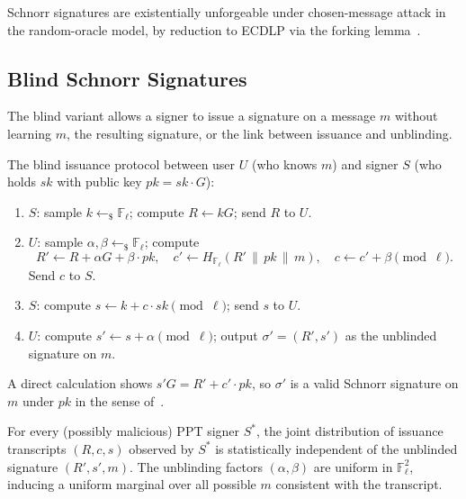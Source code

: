\begin{theorem}
\label{thm:schnorr-euf}
Schnorr signatures are existentially unforgeable under chosen-message attack in the random-oracle model, by reduction to ECDLP via the forking lemma~\cite{pointcheval-stern1996}.
\end{theorem}

\subsection{Blind Schnorr Signatures}
\label{sec:blind-schnorr}

The blind variant allows a signer to issue a signature on a message $m$ without learning $m$, the resulting signature, or the link between issuance and unblinding.

\begin{construction}
\label{con:blind-schnorr}
The blind issuance protocol between user $U$ (who knows $m$) and signer $S$ (who holds $sk$ with public key $pk = sk \cdot G$):
\begin{enumerate}[leftmargin=2em,itemsep=0.2em]
  \item $S$: sample $k \leftarrow_\$ \mathbb{F}_\ell$; compute $R \gets kG$; send $R$ to $U$.
  \item $U$: sample $\alpha, \beta \leftarrow_\$ \mathbb{F}_\ell$; compute
    \[
      R' \gets R + \alpha G + \beta \cdot pk, \quad
      c' \gets H_{\mathbb{F}_\ell}(R' \,\|\, pk \,\|\, m), \quad
      c \gets c' + \beta \pmod{\ell}.
    \]
    Send $c$ to $S$.
  \item $S$: compute $s \gets k + c \cdot sk \pmod{\ell}$; send $s$ to $U$.
  \item $U$: compute $s' \gets s + \alpha \pmod{\ell}$; output $\sigma' = (R', s')$ as the unblinded signature on $m$.
\end{enumerate}
\end{construction}

A direct calculation shows $s' G = R' + c' \cdot pk$, so $\sigma'$ is a valid Schnorr signature on $m$ under $pk$ in the sense of~.

\begin{theorem}
\label{thm:blindness}
For every (possibly malicious) PPT signer $S^*$, the joint distribution of issuance transcripts $(R, c, s)$ observed by $S^*$ is statistically independent of the unblinded signature $(R', s', m)$. The unblinding factors $(\alpha, \beta)$ are uniform in $\mathbb{F}_\ell^2$, inducing a uniform marginal over all possible $m$ consistent with the transcript.
\end{theorem}

